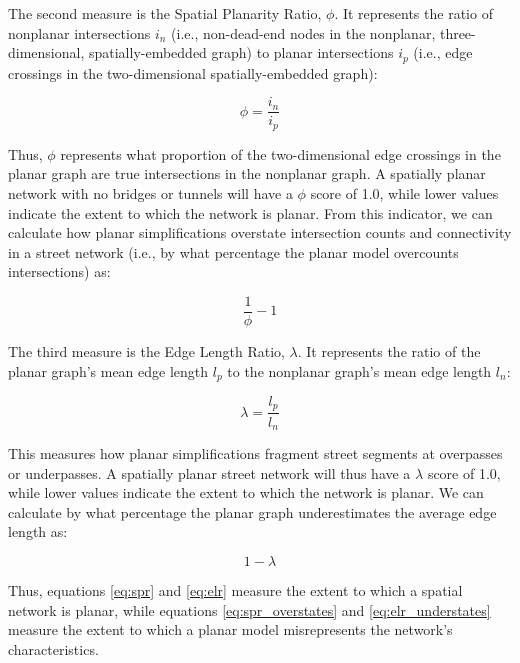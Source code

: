 \documentclass[Afour,doublespace,sageh,times]{sagej}
\begin{document}
The second measure is the Spatial Planarity Ratio, $\phi$. It represents the ratio of nonplanar intersections $i_n$ (i.e., non-dead-end nodes in the nonplanar, three-dimensional, spatially-embedded graph) to planar intersections $i_p$ (i.e., edge crossings in the two-dimensional spatially-embedded graph): 

\begin{equation}
	\label{eq:spr}
	\phi = \frac{i_n}{i_p}
\end{equation}

Thus, $\phi$ represents what proportion of the two-dimensional edge crossings in the planar graph are true intersections in the nonplanar graph. A spatially planar network with no bridges or tunnels will have a $\phi$ score of 1.0, while lower values indicate the extent to which the network is planar. From this indicator, we can calculate how planar simplifications overstate intersection counts and connectivity in a street network (i.e., by what percentage the planar model overcounts intersections) as:

\begin{equation}
	\label{eq:spr_overstates}
	\frac{1}{\phi} - 1
\end{equation}

The third measure is the Edge Length Ratio, $\lambda$. It represents the ratio of the planar graph's mean edge length $l_p$ to the nonplanar graph's mean edge length $l_n$:

\begin{equation}
	\label{eq:elr}
	\lambda = \frac{l_p}{l_n}
\end{equation}

This measures how planar simplifications fragment street segments at overpasses or underpasses. A spatially planar street network will thus have a $\lambda$ score of 1.0, while lower values indicate the extent to which the network is planar. We can calculate by what percentage the planar graph underestimates the average edge length as:

\begin{equation}
	\label{eq:elr_understates}
	1 - \lambda
\end{equation}

Thus, equations \ref{eq:spr} and \ref{eq:elr} measure the extent to which a spatial network is planar, while equations \ref{eq:spr_overstates} and \ref{eq:elr_understates} measure the extent to which a planar model misrepresents the network's characteristics.
\end{document}
